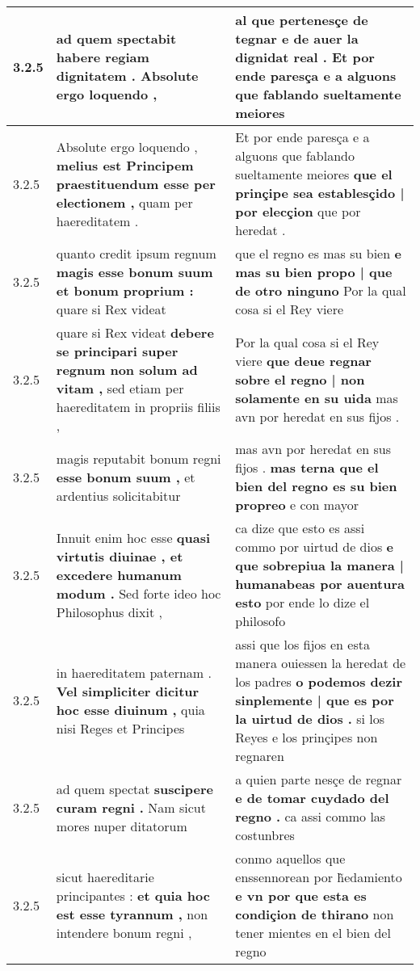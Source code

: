 \begin{tabular}{|p{1cm}|p{6.5cm}|p{6.5cm}|}
3.2.5 & ad quem spectabit \textbf{ habere regiam dignitatem . } Absolute ergo loquendo , & al que pertenesçe de tegnar \textbf{ e de auer la dignidat real . } Et por ende paresça e a alguons que fablando sueltamente meiores \\\hline
3.2.5 & Absolute ergo loquendo , \textbf{ melius est Principem praestituendum esse per electionem , } quam per haereditatem . & Et por ende paresça e a alguons que fablando sueltamente meiores \textbf{ que el prinçipe sea establesçido | por elecçion } que por heredat . \\\hline
3.2.5 & quanto credit ipsum regnum \textbf{ magis esse bonum suum et bonum proprium : } quare si Rex videat & que el regno es mas su bien \textbf{ e mas su bien propo | que de otro ninguno } Por la qual cosa si el Rey viere \\\hline
3.2.5 & quare si Rex videat \textbf{ debere se principari super regnum non solum ad vitam , } sed etiam per haereditatem in propriis filiis , & Por la qual cosa si el Rey viere \textbf{ que deue regnar sobre el regno | non solamente en su uida } mas avn por heredat en sus fijos . \\\hline
3.2.5 & magis reputabit bonum regni \textbf{ esse bonum suum , } et ardentius solicitabitur & mas avn por heredat en sus fijos . \textbf{ mas terna que el bien del regno es su bien propreo } e con mayor \\\hline
3.2.5 & Innuit enim hoc esse \textbf{ quasi virtutis diuinae , et excedere humanum modum . } Sed forte ideo hoc Philosophus dixit , & ca dize que esto es assi commo por uirtud de dios \textbf{ e que sobrepiua la manera | humanabeas por auentura esto } por ende lo dize el philosofo \\\hline
3.2.5 & in haereditatem paternam . \textbf{ Vel simpliciter dicitur hoc esse diuinum , } quia nisi Reges et Principes & assi que los fijos en esta manera ouiessen la heredat de los padres \textbf{ o podemos dezir sinplemente | que es por la uirtud de dios . } si los Reyes e los prinçipes non regnaren \\\hline
3.2.5 & ad quem spectat \textbf{ suscipere curam regni . } Nam sicut mores nuper ditatorum & a quien parte nesçe de regnar \textbf{ e de tomar cuydado del regno . } ca assi commo las costunbres \\\hline
3.2.5 & sicut haereditarie principantes : \textbf{ et quia hoc est esse tyrannum , } non intendere bonum regni , & conmo aquellos que enssennorean por h̃edamiento \textbf{ e vn por que esta es condiçion de thirano } non tener mientes en el bien del regno \\\hline

\end{tabular}
